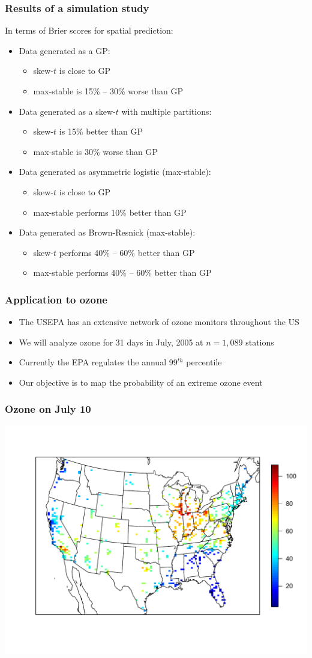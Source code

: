 \documentclass{beamer}
\newcommand{\skewt}{skew-$t$ }
\newcommand{\bit}{\begin{itemize}}
\newcommand{\eit}{\end{itemize}}
\begin{document}
\begin{frame}\frametitle{Results of a simulation study}
  In terms of Brier scores for spatial prediction:\vspace{1em}
  \bit\setlength\itemsep{1em}
  \item Data generated as a GP:
  \bit
    \item \skewt is close to GP
    \item max-stable is 15\% -- 30\% worse than GP
  \eit
  \item Data generated as a \skewt with multiple partitions:
  \bit
    \item \skewt is 15\% better than GP
    \item max-stable is 30\% worse than GP
  \eit
  \item Data generated as asymmetric logistic (max-stable):
  \bit
    \item \skewt is close to GP
    \item max-stable performs 10\% better than GP
  \eit
  \item Data generated as Brown-Resnick (max-stable):
  \bit
    \item \skewt performs 40\% -- 60\% better than GP
    \item max-stable performs 40\% -- 60\% better than GP
  \eit
  \eit
\end{frame}


\begin{frame}\frametitle{Application to ozone}
  \bit\setlength\itemsep{\fill}
  \item The USEPA has an extensive network of ozone monitors throughout the US
  \item We will analyze ozone for 31 days in July, 2005 at $n=1,089$ stations
  \item Currently the EPA regulates the annual 99$^{th}$ percentile
  \item Our objective is to map the probability of an extreme ozone event
  \eit
\end{frame}

\begin{frame}\frametitle{Ozone on July 10}
  \begin{center}
    \includegraphics[width=1.2\textheight]{plots/ozone-10jul-us}
  \end{center}
\end{frame}
\end{document}
